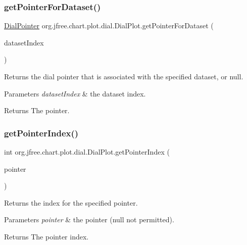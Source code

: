 \subsubsection{\texorpdfstring{get\+Pointer\+For\+Dataset()}{getPointerForDataset()}}
{\footnotesize\ttfamily \mbox{\hyperlink{classorg_1_1jfree_1_1chart_1_1plot_1_1dial_1_1_dial_pointer}{Dial\+Pointer}} org.\+jfree.\+chart.\+plot.\+dial.\+Dial\+Plot.\+get\+Pointer\+For\+Dataset (\begin{DoxyParamCaption}\item[{int}]{dataset\+Index }\end{DoxyParamCaption})}

Returns the dial pointer that is associated with the specified dataset, or {\ttfamily null}.


\begin{DoxyParams}{Parameters}
{\em dataset\+Index} & the dataset index.\\
\hline
\end{DoxyParams}
\begin{DoxyReturn}{Returns}
The pointer. 
\end{DoxyReturn}
\mbox{\label{classorg_1_1jfree_1_1chart_1_1plot_1_1dial_1_1_dial_plot_a5a81b1630be6358b774aaf63542c9e9c}} 
\subsubsection{\texorpdfstring{get\+Pointer\+Index()}{getPointerIndex()}}
{\footnotesize\ttfamily int org.\+jfree.\+chart.\+plot.\+dial.\+Dial\+Plot.\+get\+Pointer\+Index (\begin{DoxyParamCaption}\item[{\mbox{\hyperlink{classorg_1_1jfree_1_1chart_1_1plot_1_1dial_1_1_dial_pointer}{Dial\+Pointer}}}]{pointer }\end{DoxyParamCaption})}

Returns the index for the specified pointer.


\begin{DoxyParams}{Parameters}
{\em pointer} & the pointer ({\ttfamily null} not permitted).\\
\hline
\end{DoxyParams}
\begin{DoxyReturn}{Returns}
The pointer index. 
\end{DoxyReturn}
\mbox{\label{classorg_1_1jfree_1_1chart_1_1plot_1_1dial_1_1_dial_plot_add61a02d3d7ddb51ca30c4761bfa85d2}} 
